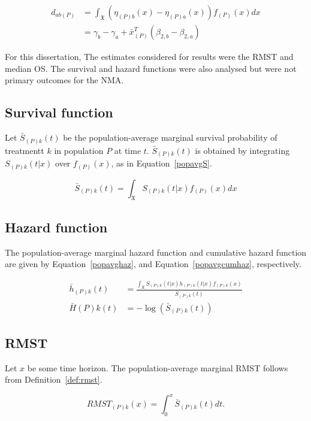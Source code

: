 \begin{align}
    d_{ab(P)} &= \int_{\mathfrak{X}}(\eta_{(P)b}(x) - \eta_{(P)a}(x))f_{(P)}(x)dx \label{popavgdInt} \\
              &= \gamma_b - \gamma_a + \bar{x}^T_{(P)}(\beta_{2,b}-\beta_{2,a}) \label{popavd}
\end{align}

For this dissertation, The estimates considered for results were the RMST and median OS. The survival and hazard functions were also analysed but were not primary outcomes for the NMA.

\subsection{Survival function}
Let $\bar{S}_{(P)k}(t)$ be the population-average marginal survival probability of treatmentt $k$ in population $P$ at time $t$. $\bar{S}_{(P)k}(t)$ is obtained by integrating $S_{(P)k}(t|x)$ over $f_{(P)}(x)$, as in Equation~\ref{popavgS}.

\begin{equation}
    \bar{S}_{(P)k}(t) = \int_{\mathfrak{X}}S_{(P)k}(t|x)f_{(P)}(x)dx
    \label{popavgS}
\end{equation}

\subsection{Hazard function}

The population-average marginal hazard function and cumulative hazard function are given by Equation~\ref{popavghaz}, and Equation~\ref{popavgcumhaz}, respectively.

\begin{align}
    \bar{h}_{(P)k}(t) &= \frac{\int_{\mathfrak{X}}S_{(P)k}(t|x)h_{(P)k}(t|x)f_{(P)k}(x)}{\bar{S}_{(P)k}(t)} \label{popavghaz}\\
    \bar{H}{(P)k}(t) &= -\log(\bar{S}_{(P)k}(t)) \label{popavgcumhaz}
\end{align}

\subsection{RMST}
Let $x$ be some time horizon. The population-average marginal RMST follows from Definition~\ref{def:rmst}.

\begin{equation}
    RMST_{(P)k}(x) = \int^{x}_{0} \bar{S}_{(P)k}(t)dt.
\end{equation}

